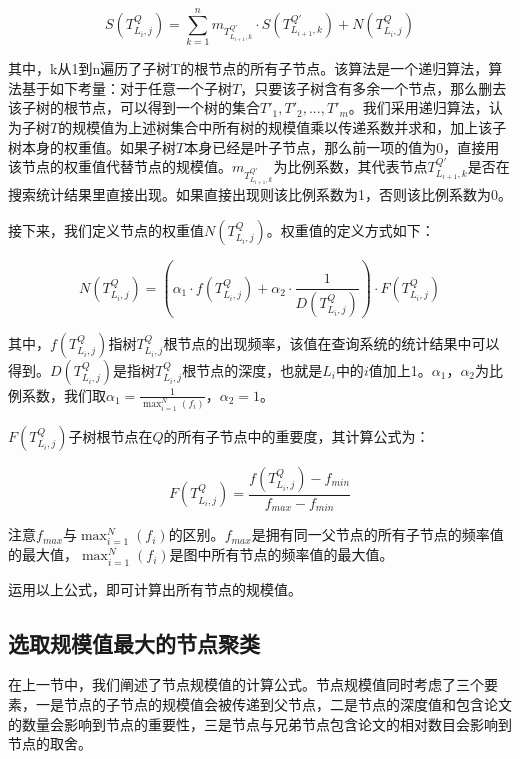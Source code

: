 \begin{equation}
S(T_{L_{i},j}^{Q})=\sum_{k=1}^{n}m_{T_{L_{i+1},k}^{Q'}}\cdot S(T_{L_{i+1},k}^{Q'})+N(T_{L_{i},j}^{Q})
\end{equation}

其中，k从1到n遍历了子树T的根节点的所有子节点。该算法是一个递归算法，算法基于如下考量：对于任意一个子树$T$，只要该子树含有多余一个节点，那么删去该子树的根节点，可以得到一个树的集合${T'_1,T'_2,...,T'_m}$。我们采用递归算法，认为子树$T$的规模值为上述树集合中所有树的规模值乘以传递系数并求和，加上该子树本身的权重值。如果子树$T$本身已经是叶子节点，那么前一项的值为0，直接用该节点的权重值代替节点的规模值。$m_{T_{L_{i+1},k}^{Q'}}$为比例系数，其代表节点$T_{L_{i+1},k}^{Q'}$是否在搜索统计结果里直接出现。如果直接出现则该比例系数为1，否则该比例系数为0。

接下来，我们定义节点的权重值$N(T_{L_{i},j}^{Q})$。权重值的定义方式如下：

\begin{equation}
N(T_{L_{i},j}^{Q})=(\alpha_1\cdot f(T_{L_{i},j}^{Q}) + \alpha_2\cdot\frac{1}{D(T_{L_{i},j}^{Q})})\cdot F(T_{L_{i},j}^{Q})
\end{equation}

\newpage

其中，$f(T_{L_{i},j}^{Q})$指树$T_{L_{i},j}^{Q}$根节点的出现频率，该值在查询系统的统计结果中可以得到。$D(T_{L_{i},j}^{Q})$是指树$T_{L_{i},j}^{Q}$根节点的深度，也就是$L_{i}$中的$i$值加上1。$\alpha_1$，$\alpha_2$为比例系数，我们取$\alpha_1=\frac{1}{\max_{i=1}^N(f_i)}$，$\alpha_2=1$。

$F(T_{L_{i},j}^{Q})$子树根节点在$Q$的所有子节点中的重要度，其计算公式为：

\begin{equation}
F(T_{L_{i},j}^{Q})=\frac{f(T_{L_{i},j}^{Q})-f_{min}}{f_{max}-f_{min}}
\end{equation}

注意$f_{max}$与$\max_{i=1}^N(f_i)$的区别。$f_{max}$是拥有同一父节点的所有子节点的频率值的最大值，$\max_{i=1}^N(f_i)$是图中所有节点的频率值的最大值。

运用以上公式，即可计算出所有节点的规模值。

\subsection{选取规模值最大的节点聚类}

在上一节中，我们阐述了节点规模值的计算公式。节点规模值同时考虑了三个要素，一是节点的子节点的规模值会被传递到父节点，二是节点的深度值和包含论文的数量会影响到节点的重要性，三是节点与兄弟节点包含论文的相对数目会影响到节点的取舍。

